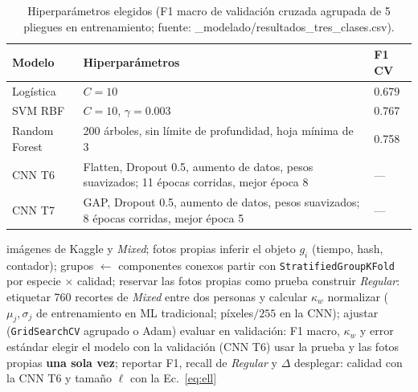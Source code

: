 \documentclass[conference]{IEEEtran}
\begin{document}
\begin{table}[t]
\centering
\caption{Hiperparámetros elegidos (F1 macro de validación cruzada agrupada de 5 pliegues en entrenamiento; fuente: {\normalfont{}\_modelado/resultados\_tres\_clases.csv}).}
\label{tab:hp}
\scriptsize
\begin{tabular}{@{}p{1.7cm}p{4.2cm}p{1.2cm}@{}}
\toprule
Modelo & Hiperpar\'ametros & F1 CV \\
\midrule
Log\'istica & $C=10$ & 0.679 \\
SVM RBF & $C=10$, $\gamma=0.003$ & 0.767 \\
Random Forest & 200 \'arboles, sin l\'imite de profundidad, hoja m\'inima de 3 & 0.758 \\
CNN T6 & Flatten, Dropout 0.5, aumento de datos, pesos suavizados; 11 \'epocas corridas, mejor \'epoca 8 & --- \\
CNN T7 & GAP, Dropout 0.5, aumento de datos, pesos suavizados; 8 \'epocas corridas, mejor \'epoca 5 & --- \\
\bottomrule
\end{tabular}
\end{table}

\begin{algorithm}[t]
\caption{Pipeline de entrenamiento, evaluaci\'on y despliegue.}
\label{alg:pipeline}
\scriptsize
\begin{algorithmic}[1]
\Require im\'agenes de Kaggle y \emph{Mixed}; fotos propias
\State inferir el objeto $g_i$ (tiempo, hash, contador); grupos $\leftarrow$ componentes conexos
\State partir con \texttt{StratifiedGroupKFold} por especie $\times$ calidad; reservar las fotos propias como prueba
\State construir \emph{Regular}: etiquetar 760 recortes de \emph{Mixed} entre dos personas y calcular $\kappa_w$
  \State normalizar ($\mu_j,\sigma_j$ de entrenamiento en ML tradicional; p\'ixeles$/255$ en la CNN); ajustar (\texttt{GridSearchCV} agrupado o Adam)
  \State evaluar en validaci\'on: F1 macro, $\kappa_w$ y error est\'andar
\EndFor
\State elegir el modelo con la validaci\'on (CNN T6)
\State usar la prueba y las fotos propias \textbf{una sola vez}; reportar F1, recall de \emph{Regular} y $\Delta$
\State desplegar: calidad con la CNN T6 y tama\~no $\ell$ con la Ec.~\eqref{eq:ell}
\end{algorithmic}
\end{algorithm}
\end{document}
